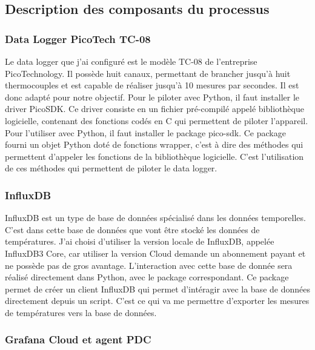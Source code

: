 \documentclass[12pt, a4paper]{article}
\begin{document}
\subsection{Description des composants du processus}

\subsubsection{Data Logger PicoTech TC-08}\label{subsubsec:TC08}

Le data logger que j'ai configuré est le modèle TC-08 de l'entreprise PicoTechnology. Il possède huit canaux, permettant de brancher jusqu'à huit thermocouples et est capable de réaliser jusqu'à 10 mesures par secondes. Il est donc adapté pour notre objectif. Pour le piloter avec Python, il faut installer le driver PicoSDK. Ce driver consiste en un fichier pré-compilé appelé bibliothèque logicielle, contenant des fonctions codés en C qui permettent de piloter l'appareil. Pour l'utiliser avec Python, il faut installer le package pico-sdk. Ce package fourni un objet Python doté de fonctions wrapper, c'est à dire des méthodes qui permettent d'appeler les fonctions de la bibliothèque logicielle. C'est l'utilisation de ces méthodes qui permettent de piloter le data logger.

\subsubsection{InfluxDB}

InfluxDB est un type de base de données spécialisé dans les données temporelles. C'est dans cette base de données que vont être stocké les données de températures. J'ai choisi d'utiliser la version locale de InfluxDB, appelée InfluxDB3 Core, car utiliser la version Cloud demande un abonnement payant et ne possède pas de gros avantage. L'interaction avec cette base de donnée sera réalisé directement dans Python, avec le package correspondant. Ce package permet de créer un client InfluxDB qui permet d'intéragir avec la base de données directement depuis un script. C'est ce qui va me permettre d'exporter les mesures de températures vers la base de données. 

\subsubsection{Grafana Cloud et agent PDC}
\end{document}
